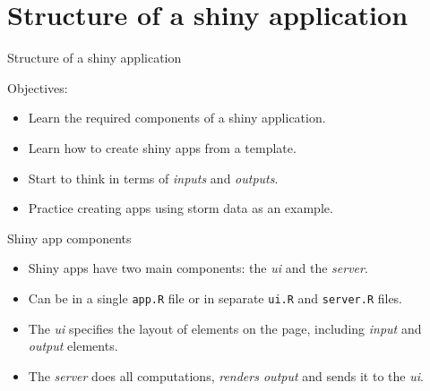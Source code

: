 \documentclass[
  12pt,
  ignorenonframetext,
]{beamer}
\providecommand{\tightlist}{%
  \setlength{\itemsep}{0pt}\setlength{\parskip}{0pt}}
\begin{document}
\hypertarget{structure-of-a-shiny-application}{%
\section{Structure of a shiny
application}\label{structure-of-a-shiny-application}}

\begin{frame}{Structure of a shiny application}

Objectives:

\begin{itemize}
\item
  Learn the required components of a shiny application.
\item
  Learn how to create shiny apps from a template.
\item
  Start to think in terms of \emph{inputs} and \emph{outputs}.
\item
  Practice creating apps using storm data as an example.
\end{itemize}

\end{frame}

\begin{frame}[fragile]{Shiny app components}
\protect\hypertarget{shiny-app-components}{}

\begin{itemize}[<+->]
\tightlist
\item
  Shiny apps have two main components: the \emph{ui} and the
  \emph{server}.
\end{itemize}

\begin{itemize}[<+->]
\tightlist
\item
  Can be in a single \texttt{app.R} file or in separate \texttt{ui.R}
  and \texttt{server.R} files.
\end{itemize}

\begin{itemize}[<+->]
\tightlist
\item
  The \emph{ui} specifies the layout of elements on the page, including
  \emph{input} and \emph{output} elements.
\end{itemize}

\begin{itemize}[<+->]
\tightlist
\item
  The \emph{server} does all computations, \emph{renders output} and
  sends it to the \emph{ui}.
\end{itemize}

\end{frame}
\end{document}
